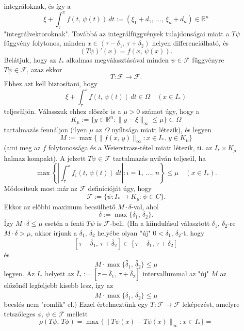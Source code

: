 \documentclass[12pt]{article}
\newcommand{\R}{\mathbb{R}}
\begin{document}
    integráloknak, és így a
    \[
        \xi + \int_\tau^x f(t, \, \psi(t)) \, dt := (\xi_1 + d_1, \, \dots, \, \xi_n + d_n) \in \R^n
    \]
    "integrálvektoroknak". Továbbá az integrálfüggvények tulajdonságai miatt a $T\psi$ függvény folytonos, minden $x \in (\tau - \delta_1, \, \tau + \delta_2)$ helyen differenciálható, és
    \[
        (T\psi)'(x) = f(x, \, \psi(x)).
    \]
    Belátjuk, hogy az $I_*$ alkalmas megválasztásával minden $\psi \in \mathcal{F}$ függvényre $T\psi \in \mathcal{F}$, azaz ekkor
    \[
        T : \mathcal{F} \to \mathcal{F}.
    \]
    Ehhez azt kell biztosítani, hogy
    \[
        \xi + \int_\tau^x f(t, \, \psi(t)) \, dt \in \Omega \quad (x \in I_*)
    \]
    teljesüljön. Válasszuk ehhez először is a $\mu > 0$ számot úgy, hogy a
    \[
        K_\mu := \{ y \in \R^n : \| y - \xi\|_\infty \leq \mu \} \subset \Omega
    \]
    tartalmazás fennáljon (ilyen $\mu$ az $\Omega$ nyíltsága miatt létezik), és legyen
    \[
        M := \max\{ \| f(x, \, y)\|_\infty : x\in I_*, \, y \in K_\mu \}
    \]
    (ami meg az $f$ folytonossága és a Weierstrass-tétel miatt létezik, ti. az $I_* \times K_\mu$ halmaz kompakt). A jelzett $T\psi \in \mathcal{F}$ tartalmazás nyilván teljesül, ha
    \[
        \max \left\{  \left| \int_\tau^x f_i(t, \, \psi(t)) \, dt \right| : i = 1, \, \dots, \, n \right\} \leq \mu \quad (x \in I_*).
    \]
    Módosítsuk most már az $\mathcal{F}$ definícióját úgy, hogy
    \[
        \mathcal{F} := \{ \psi : I_* \to K_\mu : \psi \in C \}.
    \]
    Ekkor az előbbi maximum becsülhető $M \cdot \delta$-val, ahol
    \[
        \delta := \max\{\delta_1, \, \delta_2\}.
    \]
    Így $M \cdot \delta \leq \mu$ esetén a fenti $T\psi$ is $\mathcal{F}$-beli. (Ha a kiindulásul választott $\delta_1, \, \delta_2$-re $M \cdot \delta > \mu$, akkor írjunk a $\delta_1, \, \delta_2$ helyébe olyan "új" $0 < \tilde{\delta_1}, \, \tilde{\delta_2}$-t, hogy
    \[
        [\tau - \tilde{\delta_1}, \, \tau + \tilde{\delta_2}] \subset [\tau - \delta_1, \, \tau + \delta_2]
    \]
    és
    \[
        M \cdot \max \{ \tilde{\delta_1}, \, \tilde{\delta_2} \} \leq \mu
    \]
    legyen. Az $I_*$ helyett az $\tilde{I_*} := [\tau - \tilde{\delta_1}, \, \tau + \tilde{\delta_2}]$ intervallummal az "új" $M$ az előzőnél legfeljebb kisebb lesz, így az
    \[
        M \cdot \max \{ \tilde{\delta_1}, \, \tilde{\delta_2}\} \leq \mu
    \]
    becslés nem "romlik" el.)
    Ezzel értelmeztünk egy $T : \mathcal{F} \to \mathcal{F}$ leképezést, amelyre tetszőleges $\phi, \, \psi \in \mathcal{F}$ mellett
    \[
        \rho(T\psi, \, T\phi) = \max \{ \| T\psi(x) - T\phi(x)\|_\infty : x \in I_* \} =
    \]
\end{document}
